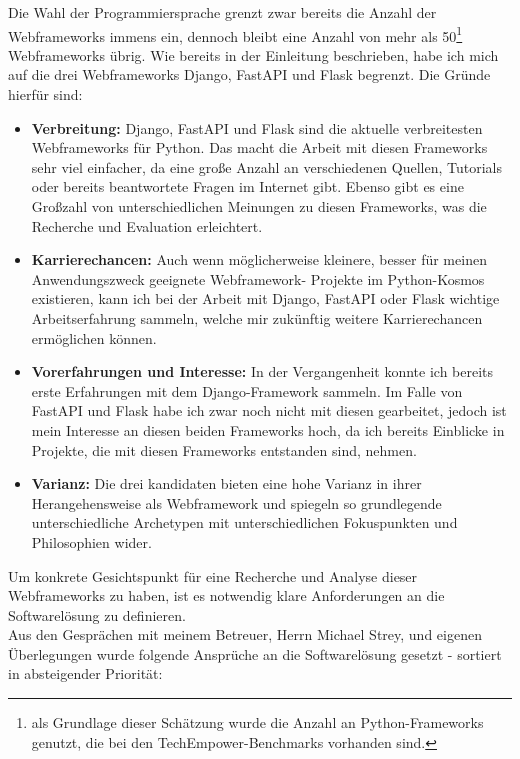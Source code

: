 \documentclass[letterpaper,11pt,leqno]{article}
\begin{document}
Die Wahl der Programmiersprache grenzt zwar bereits die Anzahl der Webframeworks immens ein, dennoch bleibt eine Anzahl von mehr als
50\footnote{als Grundlage dieser Schätzung wurde die Anzahl an Python-Frameworks genutzt, die bei den TechEmpower-Benchmarks
vorhanden sind.} Webframeworks übrig. Wie bereits in der Einleitung beschrieben, habe ich mich auf die drei Webframeworks Django,
FastAPI und Flask begrenzt. Die Gründe hierfür sind:
\begin{itemize}
	\item\textbf{Verbreitung:} Django, FastAPI und Flask sind die aktuelle verbreitesten Webframeworks für Python. Das macht die
	Arbeit mit diesen Frameworks sehr viel einfacher, da eine große Anzahl an verschiedenen Quellen, Tutorials oder bereits
	beantwortete Fragen im Internet gibt. Ebenso gibt es eine Großzahl von unterschiedlichen Meinungen zu diesen Frameworks, was
	die Recherche und Evaluation erleichtert.
	\item\textbf{Karrierechancen:} Auch wenn möglicherweise kleinere, besser für meinen Anwendungszweck geeignete Webframework-
	Projekte im Python-Kosmos existieren, kann ich bei der Arbeit mit Django, FastAPI oder Flask wichtige Arbeitserfahrung sammeln,
	welche mir zukünftig weitere Karrierechancen ermöglichen können.
	\item\textbf{Vorerfahrungen und Interesse:} In der Vergangenheit konnte ich bereits erste Erfahrungen mit dem Django-Framework
	sammeln. Im Falle von FastAPI und Flask habe ich zwar noch nicht mit diesen gearbeitet, jedoch ist mein Interesse an diesen
	beiden Frameworks hoch, da ich bereits Einblicke in Projekte, die mit diesen Frameworks entstanden sind, nehmen.
	\item\textbf{Varianz:} Die drei kandidaten bieten eine hohe Varianz in ihrer Herangehensweise als Webframework und spiegeln so
	grundlegende unterschiedliche Archetypen mit unterschiedlichen Fokuspunkten und Philosophien wider.\\
\end{itemize}
Um konkrete Gesichtspunkt für eine Recherche und Analyse dieser Webframeworks zu haben, ist es notwendig klare Anforderungen an die
Softwarelösung zu definieren.\\Aus den Gesprächen mit meinem Betreuer, Herrn Michael Strey, und eigenen Überlegungen wurde
folgende Ansprüche an die Softwarelösung gesetzt - sortiert in absteigender Priorität:
\end{document}
